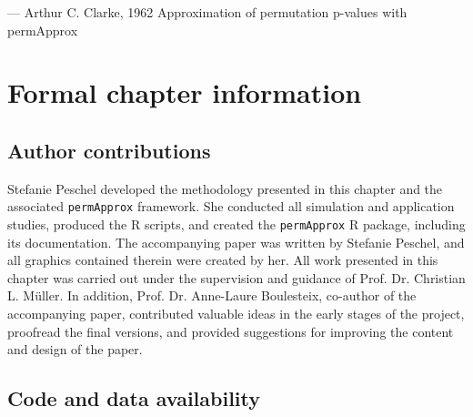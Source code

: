 
  {--- Arthur C. Clarke, 1962}
  {Approximation of permutation p-values with permApprox}
\nocite{clarke1973profiles}
\chaptercontents

\section*{Formal chapter information}

\subsection*{Author contributions}

Stefanie Peschel developed the methodology presented in this chapter and the associated \texttt{permApprox} framework. She conducted all simulation and application studies, produced the R scripts, and created the \texttt{permApprox} R package, including its documentation. The accompanying paper was written by Stefanie Peschel, and all graphics contained therein were created by her. All work presented in this chapter was carried out under the supervision and guidance of Prof. Dr. Christian L. Müller. In addition, Prof. Dr. Anne-Laure Boulesteix, co-author of the accompanying paper, contributed valuable ideas in the early stages of the project, proofread the final versions, and provided suggestions for improving the content and design of the paper.

\subsection*{Code and data availability}

